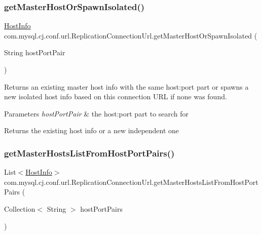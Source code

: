 \subsubsection{\texorpdfstring{get\+Master\+Host\+Or\+Spawn\+Isolated()}{getMasterHostOrSpawnIsolated()}}
{\footnotesize\ttfamily \mbox{\hyperlink{classcom_1_1mysql_1_1cj_1_1conf_1_1_host_info}{Host\+Info}} com.\+mysql.\+cj.\+conf.\+url.\+Replication\+Connection\+Url.\+get\+Master\+Host\+Or\+Spawn\+Isolated (\begin{DoxyParamCaption}\item[{String}]{host\+Port\+Pair }\end{DoxyParamCaption})}

Returns an existing master host info with the same host\+:port part or spawns a new isolated host info based on this connection U\+RL if none was found.


\begin{DoxyParams}{Parameters}
{\em host\+Port\+Pair} & the host\+:port part to search for \\
\hline
\end{DoxyParams}
\begin{DoxyReturn}{Returns}
the existing host info or a new independent one 
\end{DoxyReturn}
\mbox{\label{classcom_1_1mysql_1_1cj_1_1conf_1_1url_1_1_replication_connection_url_a210692bdc210c25db156b88f7024e8bb}} 
\subsubsection{\texorpdfstring{get\+Master\+Hosts\+List\+From\+Host\+Port\+Pairs()}{getMasterHostsListFromHostPortPairs()}}
{\footnotesize\ttfamily List$<$\mbox{\hyperlink{classcom_1_1mysql_1_1cj_1_1conf_1_1_host_info}{Host\+Info}}$>$ com.\+mysql.\+cj.\+conf.\+url.\+Replication\+Connection\+Url.\+get\+Master\+Hosts\+List\+From\+Host\+Port\+Pairs (\begin{DoxyParamCaption}\item[{Collection$<$ String $>$}]{host\+Port\+Pairs }\end{DoxyParamCaption})}

